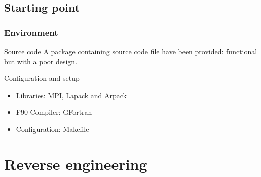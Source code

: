 \documentclass[10p]{beamer}
\begin{document}
\subsection{Starting point}
\begin{frame}
\frametitle{Environment}
\begin{block}{Source code}
A package containing source code file have been provided: functional but with a poor design.
\end{block}
\begin{block}{Configuration and setup}
\begin{itemize}
\item Libraries: MPI, Lapack and Arpack
\item F90 Compiler: GFortran
\item Configuration: Makefile
\end{itemize}
\end{block}
\end{frame}
\section{Reverse engineering}
\end{document}
